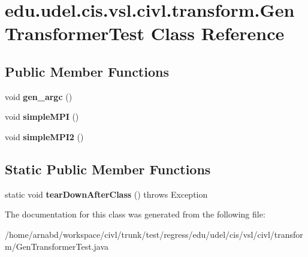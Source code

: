 \hypertarget{classedu_1_1udel_1_1cis_1_1vsl_1_1civl_1_1transform_1_1GenTransformerTest}{}\section{edu.\+udel.\+cis.\+vsl.\+civl.\+transform.\+Gen\+Transformer\+Test Class Reference}
\label{classedu_1_1udel_1_1cis_1_1vsl_1_1civl_1_1transform_1_1GenTransformerTest}
\subsection*{Public Member Functions}
\begin{DoxyCompactItemize}
\item 
\hypertarget{classedu_1_1udel_1_1cis_1_1vsl_1_1civl_1_1transform_1_1GenTransformerTest_ae11f6342aeb7df9e99c718c9e63a04c1}{}void {\bfseries gen\+\_\+argc} ()\label{classedu_1_1udel_1_1cis_1_1vsl_1_1civl_1_1transform_1_1GenTransformerTest_ae11f6342aeb7df9e99c718c9e63a04c1}

\item 
\hypertarget{classedu_1_1udel_1_1cis_1_1vsl_1_1civl_1_1transform_1_1GenTransformerTest_a5e30f88ab719c6e35b8f63b525d8ba94}{}void {\bfseries simple\+M\+P\+I} ()\label{classedu_1_1udel_1_1cis_1_1vsl_1_1civl_1_1transform_1_1GenTransformerTest_a5e30f88ab719c6e35b8f63b525d8ba94}

\item 
\hypertarget{classedu_1_1udel_1_1cis_1_1vsl_1_1civl_1_1transform_1_1GenTransformerTest_a18cd017c848bf8c38d3de6346a52d594}{}void {\bfseries simple\+M\+P\+I2} ()\label{classedu_1_1udel_1_1cis_1_1vsl_1_1civl_1_1transform_1_1GenTransformerTest_a18cd017c848bf8c38d3de6346a52d594}

\end{DoxyCompactItemize}
\subsection*{Static Public Member Functions}
\begin{DoxyCompactItemize}
\item 
\hypertarget{classedu_1_1udel_1_1cis_1_1vsl_1_1civl_1_1transform_1_1GenTransformerTest_aaa21995334052214c52c923746fafa0f}{}static void {\bfseries tear\+Down\+After\+Class} ()  throws Exception \label{classedu_1_1udel_1_1cis_1_1vsl_1_1civl_1_1transform_1_1GenTransformerTest_aaa21995334052214c52c923746fafa0f}

\end{DoxyCompactItemize}


The documentation for this class was generated from the following file\+:\begin{DoxyCompactItemize}
\item 
/home/arnabd/workspace/civl/trunk/test/regress/edu/udel/cis/vsl/civl/transform/Gen\+Transformer\+Test.\+java\end{DoxyCompactItemize}
